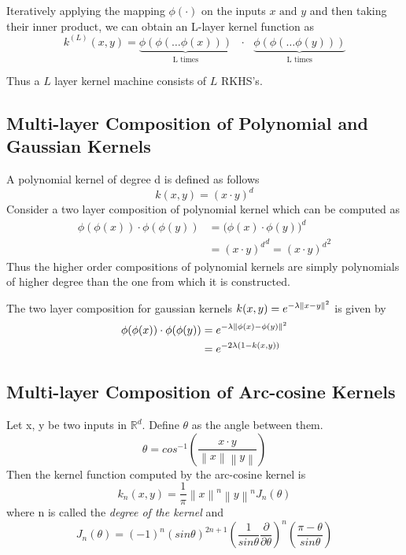 Iteratively applying the mapping $\phi(\cdot)$ on the inputs $x \textrm{ and } y$ and then taking their inner product, we can obtain an L-layer kernel function as
\[ k^{(L)}(x,y) = \underbrace{\phi(\phi(\ldots \phi(x)))}_{\textrm{L times}} \textrm{ } \cdot \textrm{ } \underbrace{\phi(\phi(\ldots \phi(y)))}_{\textrm{L times}} \]

Thus a $L$ layer kernel machine consists of $L$ RKHS's.

\subsection{Multi-layer Composition of Polynomial and Gaussian Kernels}
\label{chap2_mlother}
A polynomial kernel of degree d is defined as follows
\[k(x, y) = (x \cdot y)^d\]
Consider a two layer composition of polynomial kernel which can be computed as
\begin{equation*}
\begin{aligned}
\phi(\phi(x)) \cdot \phi(\phi(y)) &= \bigg(\phi(x) \cdot \phi(y)\bigg)^d \\
& = {(x \cdot y)^d}^d =  {(x \cdot y)^d}^2 
\end{aligned}
\end{equation*}
Thus the higher order compositions of polynomial kernels are simply polynomials of higher degree than the one from which it is constructed.

The two layer composition for gaussian kernels $k(x, y) = e^{-\lambda\left\lVert x-y\right\rVert^2} $ is given by
\begin{equation*}
\begin{aligned}
\phi(\phi(x)) \cdot \phi(\phi(y)) &= e^{-\lambda\left\lVert\phi(x)-\phi(y)\right\rVert^2} \\
& = e^{-2\lambda(1-k(x, y))}
\end{aligned}
\end{equation*}

\subsection{Multi-layer Composition of Arc-cosine Kernels}
\label{chap2_mlarc}
Let x, y be two inputs in $\mathbb{R}^d$. Define $\theta$ as the angle between them.
\[ \theta = cos^{-1}\left ( \frac{x\cdot y}{\left \| x \right \| \left \| y \right \|} \right ) \]
Then the kernel function computed by the arc-cosine kernel is
\begin{equation}
k_n(x,y) = \frac{1}{\pi}\left \| x \right \|^n \left \| y \right \|^n J_n(\theta)
\label{arc_cosine_kernel} 
\end{equation}
where n is called the \textit{degree of the kernel} and
\[ J_n(\theta) = (-1)^n(sin\theta)^{2n+1} \left ( \frac{1}{sin\theta} \frac{\partial}{\partial \theta} \right )^n \left ( \frac{\pi-\theta}{sin\theta} \right ) \]

